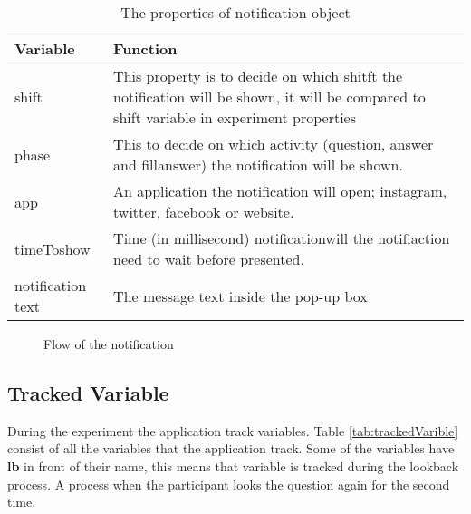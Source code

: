 \begin{table}[!b]
\centering
\small
\footnotesize
\begin{tabu}{|X[2,l]|X[5,l]|}
\hline
Variable          & Function                                                                                                                                  \\ \hline
shift             & This property is to decide on which shitft the notification will be shown, it will be compared to shift variable in experiment properties \\ \hline
phase             & This  to decide on which activity (question, answer and fillanswer) the notification will be shown.                          \\ \hline
app               & An application the notification will open; instagram, twitter, facebook or website.                           \\ \hline
timeToshow        & Time (in millisecond) notificationwill the notifiaction need to wait before presented.                                                           \\ \hline
notification text & The message text inside the pop-up box                                                                                     \\ \hline
\end{tabu}
\caption{The properties of notification object}
\label{NotifactionProperties}

\end{table}


\begin{figure}[!b]
\begin{center}
\end{center}
\centering
\captionsetup{justification=centering}
\caption{Flow of the notification}
\label{fig:clicked_notification_flow}
\end{figure}



\subsection{Tracked Variable}
During the experiment the application track variables. Table \ref{tab:trackedVarible} consist of all the variables that the application track.
Some of the variables have \textbf{lb} in front of their name, this means that variable is tracked during the lookback process.
A process when the participant looks the question again for the second time.

